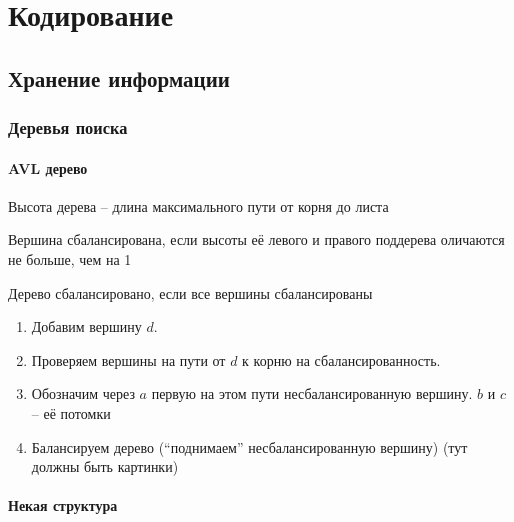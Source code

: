 \chapter{Кодирование}

\section{Хранение информации}

\subsection{Деревья поиска}

\subsubsection{AVL дерево}

\begin{definition}
	Высота дерева -- длина максимального пути от корня до листа
\end{definition}

\begin{definition}
	Вершина сбалансирована, если высоты её левого и правого поддерева оличаются не больше, чем на 1
\end{definition}

\begin{definition}
	Дерево сбалансировано, если все вершины сбалансированы
\end{definition}

\begin{algorithm}
    \hfill
    \begin{enumerate}
    	\item Добавим вершину $d$.
        \item Проверяем вершины на пути от $d$ к корню на сбалансированность.
        \item Обозначим через $a$ первую на этом пути несбалансированную вершину. $b$ и $c$ -- её потомки
        \item Балансируем дерево (``поднимаем'' несбалансированную вершину) (тут должны быть картинки)
    \end{enumerate}

\end{algorithm}

\subsubsection{Некая структура}


